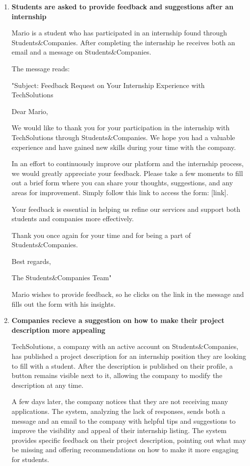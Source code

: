 \begin{enumerate}
    

    \item \textbf{Students are asked to provide feedback and suggestions after an internship}

    Mario is a student who has participated in an internship found through Students\&Companies. After completing the internship he receives both an email and a message on Students\&Companies.

    The message reads:

    "Subject: Feedback Request on Your Internship Experience with TechSolutions

    Dear Mario,

    We would like to thank you for your participation in the internship with TechSolutions through Students\&Companies. We hope you had a valuable experience and have gained new skills during your time with the company.

    In an effort to continuously improve our platform and the internship process, we would greatly appreciate your feedback. Please take a few moments to fill out a brief form where you can share your thoughts, suggestions, and any areas for improvement. Simply follow this link to access the form: [link].

    Your feedback is essential in helping us refine our services and support both students and companies more effectively.

    Thank you once again for your time and for being a part of Students\&Companies.

    Best regards,
    
    The Students\&Companies Team"

    Mario wishes to provide feedback, so he clicks on the link in the message and fills out the form with his insights.

    \item \textbf{Companies recieve a suggestion on how to make their project description more appealing}

    TechSolutions, a company with an active account on Students\&Companies, has published a project description for an internship position they are looking to fill with a student. After the description is published on their profile, a button remains visible next to it, allowing the company to modify the description at any time.

    A few days later, the company notices that they are not receiving many applications. The system, analyzing the lack of responses, sends both a message and an email to the company with helpful tips and suggestions to improve the visibility and appeal of their internship listing. The system provides specific feedback on their project description, pointing out what may be missing and offering recommendations on how to make it more engaging for students.


\end{enumerate}
